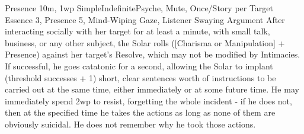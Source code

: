 \begin{Ability}{Presence}
  {10m, 1wp}
  {Simple}{Indefinite}{Psyche, Mute, Once/Story per Target}
  {Essence 3, Presence 5, Mind-Wiping Gaze, Listener Swaying Argument}
  After interacting socially with her target for at least a minute, with small talk, business, or any other subject, the Solar rolls ([Charisma or Manipulation] + Presence) against her target's Resolve, which may not be modified by Intimacies. If successful, he goes catatonic for a second, allowing the Solar to implant (threshold successes + 1) short, clear sentences worth of instructions to be carried out at the same time, either immediately or at some future time. He may immediately spend 2wp to resist, forgetting the whole incident - if he does not, then at the specified time he takes the actions as long as none of them are obviously suicidal. He does not remember why he took those actions.

\end{Ability}

